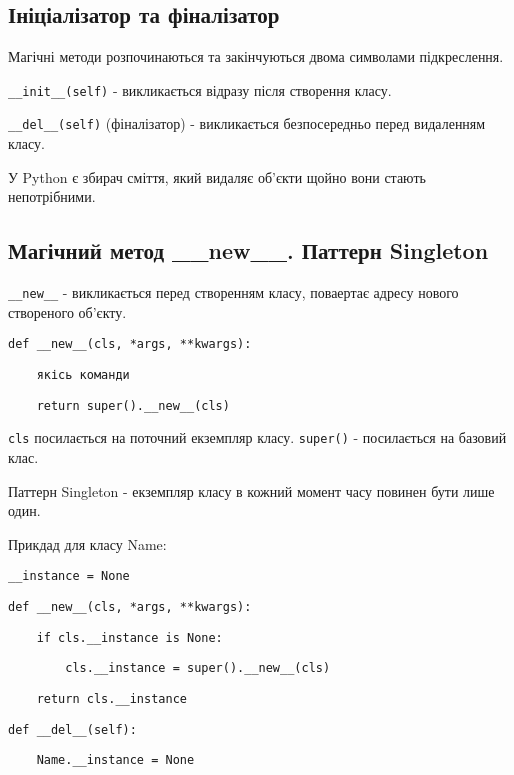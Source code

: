 \subsection{Ініціалізатор та фіналізатор} 
\begin{frame}
Магічні методи розпочинаються та закінчуються двома символами підкреслення.

\texttt{\_\_init\_\_(self)} - викликається відразу після створення класу.

\texttt{\_\_del\_\_(self)} (фіналізатор) - викликається безпосередньо перед видаленням класу. 

У Python є збирач сміття, який видаляє об'єкти щойно вони стають непотрібними.

\end{frame}

\subsection{Магічний метод \_\_new\_\_. Паттерн Singleton} 
\begin{frame}
\texttt{\_\_new\_\_} - викликається перед створенням класу, поваертає адресу нового створеного об'єкту. 

\texttt{def \_\_new\_\_(cls, *args, **kwargs):} 

\texttt{~~~~якісь команди} 

\texttt{~~~~return super().\_\_new\_\_(cls)} 

\texttt{cls} посилається на поточний екземпляр класу. \texttt{super()} - посилається на базовий клас.

\end{frame}

\begin{frame}
Паттерн Singleton - екземпляр класу в кожний момент часу повинен бути лише один.

Прикдад для класу Name:

\texttt{\_\_instance = None}
 
\texttt{def \_\_new\_\_(cls, *args, **kwargs):} 

\texttt{~~~~if cls.\_\_instance is None:} 

\texttt{~~~~~~~~cls.\_\_instance = super().\_\_new\_\_(cls)} 

\texttt{~~~~return cls.\_\_instance} 

\texttt{def \_\_del\_\_(self):} 

\texttt{~~~~Name.\_\_instance = None}
\end{frame}
